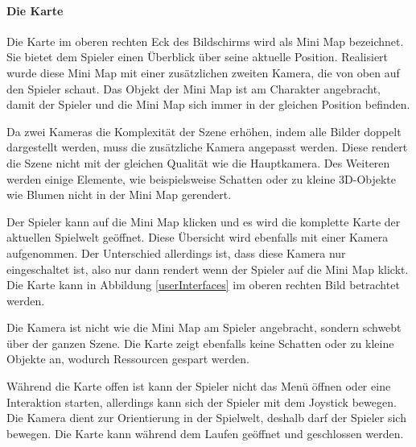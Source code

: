 			\paragraph{Die Karte}
				Die Karte im oberen rechten Eck des Bildschirms wird als Mini Map bezeichnet. Sie bietet dem Spieler einen Überblick über seine aktuelle Position. Realisiert wurde diese Mini Map mit einer zusätzlichen zweiten Kamera, die von oben auf den Spieler schaut. Das Objekt der Mini Map ist am Charakter angebracht, damit der Spieler und die Mini Map sich immer in der gleichen Position befinden.
								
				Da zwei Kameras die Komplexität der Szene erhöhen, indem alle Bilder doppelt dargestellt werden, muss die zusätzliche Kamera angepasst werden. Diese rendert die Szene nicht mit der gleichen Qualität wie die Hauptkamera. Des Weiteren werden einige Elemente, wie beispielsweise Schatten oder zu kleine 3D-Objekte wie Blumen nicht in der Mini Map gerendert. 
				
				Der Spieler kann auf die Mini Map klicken und es wird die komplette Karte der aktuellen Spielwelt geöffnet. Diese Übersicht wird ebenfalls mit einer Kamera aufgenommen. Der Unterschied allerdings ist, dass diese Kamera nur eingeschaltet ist, also nur dann rendert wenn der Spieler auf die Mini Map klickt. Die Karte kann in Abbildung \ref{userInterfaces} im oberen rechten Bild betrachtet werden.
				
				Die Kamera ist nicht wie die Mini Map am Spieler angebracht, sondern schwebt über der ganzen Szene. Die Karte zeigt ebenfalls keine Schatten oder zu kleine Objekte an, wodurch Ressourcen gespart werden.
				
				Während die Karte offen ist kann der Spieler nicht das Menü öffnen oder eine Interaktion starten, allerdings kann sich der Spieler mit dem Joystick bewegen. Die Kamera dient zur Orientierung in der Spielwelt, deshalb darf der Spieler sich bewegen. Die Karte kann während dem Laufen geöffnet und geschlossen werden.
			
